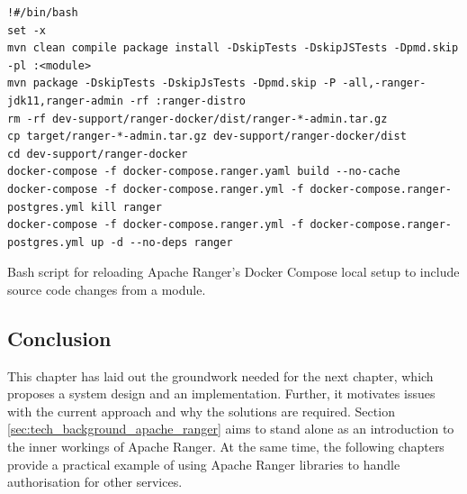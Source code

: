 \begin{listing}
\begin{verbatim}
!#/bin/bash
set -x
mvn clean compile package install -DskipTests -DskipJSTests -Dpmd.skip -pl :<module>
mvn package -DskipTests -DskipJsTests -Dpmd.skip -P -all,-ranger-jdk11,ranger-admin -rf :ranger-distro
rm -rf dev-support/ranger-docker/dist/ranger-*-admin.tar.gz
cp target/ranger-*-admin.tar.gz dev-support/ranger-docker/dist
cd dev-support/ranger-docker
docker-compose -f docker-compose.ranger.yaml build --no-cache
docker-compose -f docker-compose.ranger.yml -f docker-compose.ranger-postgres.yml kill ranger
docker-compose -f docker-compose.ranger.yml -f docker-compose.ranger-postgres.yml up -d --no-deps ranger
\end{verbatim}
\caption{\label{listing:ranger_module_reload_bash} Bash script for reloading Apache Ranger's Docker Compose local setup to include source code changes from a module.}
\end{listing}


\subsection{Conclusion}

This chapter has laid out the groundwork needed for the next chapter, which proposes a system design and an implementation. Further, it motivates issues with the current approach and why the solutions are required. Section \ref{sec:tech_background_apache_ranger} aims to stand alone as an introduction to the inner workings of Apache Ranger. At the same time, the following chapters provide a practical example of using Apache Ranger libraries to handle authorisation for other services.
